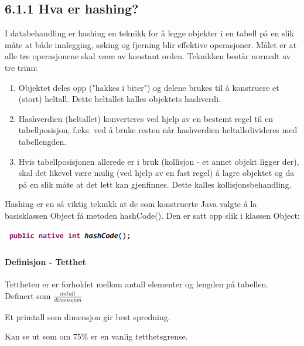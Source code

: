 \documentclass[11pt]{article}
\begin{document}
    \subsection{6.1.1 Hva er hashing?}
        I databehandling er hashing en teknikk for å legge objekter i en tabell på en slik måte at både
        innlegging, søking og fjerning blir effektive operasjoner. Målet er at alle tre operasjonene skal
        være av konstant orden. Teknikken består normalt av tre trinn:
        \begin{enumerate}
            \item Objektet deles opp ("hakkes i biter") og delene brukes til å konstruere et (stort) heltall.
                Dette heltallet kalles objektets hashverdi.
            \item Hashverdien (heltallet) konverteres ved hjelp av en bestemt regel til en tabellposisjon,
                f.eks. ved å bruke resten når hashverdien heltallsdivideres med tabellengden.
            \item  Hvis tabellposisjonen allerede er i bruk (kollisjon - et annet objekt ligger der), skal det
                likevel være mulig (ved hjelp av en fast regel) å lagre objektet og da på en slik måte at
                det lett kan gjenfinnes. Dette kalles kollisjonsbehandling.
        \end{enumerate}

        \begin{multicols}{2}
            Hashing er en så viktig teknikk at de som konstruerte Java valgte å la basisklassen Object få
            metoden hashCode(). Den er satt opp slik i klassen Object:

            \columnbreak
            \includegraphics{k-6.1.1a.png}

        \end{multicols}

        \paragraph{Definisjon - Tetthet}
        Tettheten er er forholdet mellom antall elementer og lengden på tabellen. \\
        Definert som $\frac{antall}{dimensjon}$

        Et primtall som dimensjon gir best spredning.

        Kan se ut som om 75\% er en vanlig tetthetsgrense.
\end{document}
